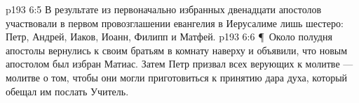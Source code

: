 \vs p193 6:5 В результате из первоначально избранных двенадцати апостолов участвовали в первом провозглашении евангелия в Иерусалиме лишь шестеро: Петр, Андрей, Иаков, Иоанн, Филипп и Матфей.
\vs p193 6:6 \P\ Около полудня апостолы вернулись к своим братьям в комнату наверху и объявили, что новым апостолом был избран Матиас. Затем Петр призвал всех верующих к молитве --- молитве о том, чтобы они могли приготовиться к принятию дара духа, который обещал им послать Учитель.
